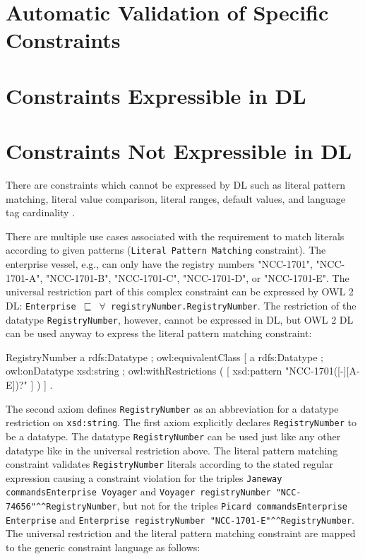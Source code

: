 \documentclass{llncs}
\newcommand{\ms}[1]{\texttt{#1}}
\begin{document}
\section{Automatic Validation of Specific Constraints}

\section{Constraints Expressible in DL}

\section{Constraints Not Expressible in DL}

There are constraints which cannot be expressed by DL such as literal pattern matching, literal value comparison, literal ranges, default values, and language tag cardinality \cite{BoschNolleAcarEckert2015}.


There are multiple use cases associated with the requirement to match literals according to given patterns (\ms{Literal Pattern Matching} constraint).
The enterprise vessel, e.g.,  can only have the registry numbers "NCC-1701", "NCC-1701-A", "NCC-1701-B", "NCC-1701-C", "NCC-1701-D", or "NCC-1701-E".
The universal restriction part of this complex constraint can be expressed by OWL 2 DL:
\ms{Enterprise $\sqsubseteq$ $\forall$ registryNumber.RegistryNumber}.
The restriction of the datatype \ms{RegistryNumber}, however, cannot be expressed in DL, but OWL 2 DL can be used anyway to express the literal pattern matching constraint:

\begin{ex}
RegistryNumber
    a rdfs:Datatype ;
    owl:equivalentClass [
        a rdfs:Datatype ;
        owl:onDatatype xsd:string ;
        owl:withRestrictions ( 
            [ xsd:pattern "NCC-1701([-][A-E])?" ] ) ] .
\end{ex}

The second axiom defines \ms{RegistryNumber} as an abbreviation for a datatype restriction on \ms{xsd:string}. 
The first axiom explicitly declares \ms{RegistryNumber} to be a datatype. 
The datatype \ms{RegistryNumber} can be used just like any other datatype like in the universal restriction above.
The literal pattern matching constraint validates \ms{RegistryNumber} literals according to the stated regular expression causing a constraint violation for the triples 
\ms{Janeway commandsEnterprise Voyager} and \ms{Voyager registryNumber "NCC-74656"\textasciicircum{}\textasciicircum{}RegistryNumber}, 
but not for the triples \ms{Picard commandsEnterprise Enterprise} and \ms{Enterprise registryNumber "NCC-1701-E"\textasciicircum{}\textasciicircum{}RegistryNumber}.
The universal restriction and the literal pattern matching constraint are mapped to the generic constraint language as follows:
\end{document}
